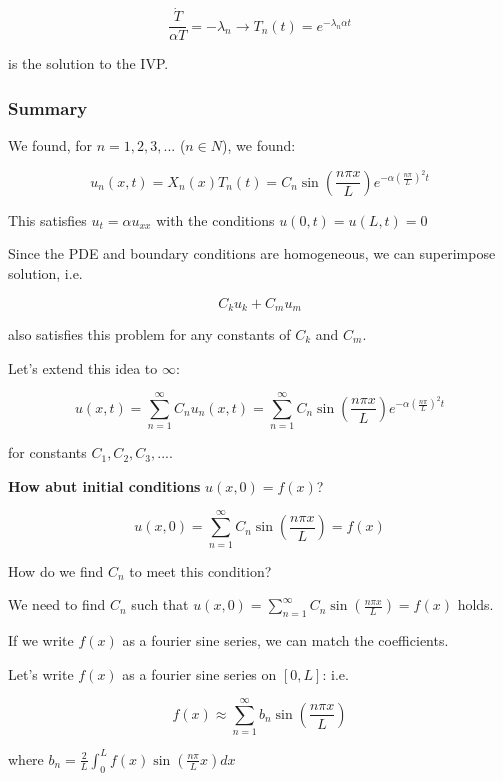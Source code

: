 $$\frac{\dot{T}}{\alpha T} = -\lambda_n \longrightarrow T_n(t) = e^{- \lambda_n \alpha t}$$

is the solution to the IVP. 

\subsubsection{Summary}

We found, for $n = 1,2,3,...$ ($n \in N$), we found:

$$u_n (x,t) = X_n (x) T_n (t) = C_n \sin \left(\frac{n \pi x}{L} \right) e^{- \alpha \left( \frac{n \pi}{L} \right)^2 t}$$

This satisfies $u_t = \alpha u_{xx}$ with the conditions $u(0,t) = u(L,t) = 0$

Since the PDE and boundary conditions are homogeneous, we can superimpose solution, i.e. 

$$C_k u_k + C_m u_m$$


also satisfies this problem for any constants of $C_k$ and $C_m$. 

Let's extend this idea to $\infty$:

$$u(x,t) = \sum_{n = 1}^\infty C_n u_n(x,t) = \sum_{n = 1}^\infty C_n \sin \left( \frac{n \pi x}{L} \right) e^{- \alpha \left( \frac{n \pi}{L} \right)^2 t}$$

for constants $C_1, C_2, C_3,...$. 

\textbf{How abut initial conditions} $u(x,0) = f(x)$?

\begin{equation}
    u(x,0) = \sum_{n = 1}^\infty C_n \sin \left( \frac{n \pi x}{L} \right) = f(x)
\end{equation}

How do we find $C_n$ to meet this condition?

We need to find $C_n$ such that $u(x,0) = \sum_{n = 1}^\infty C_n \sin \left( \frac{n \pi x}{L} \right) = f(x)$ holds. 

If we write $f(x)$ as a fourier sine series, we can match the coefficients. 

Let's write $f(x)$ as a fourier sine series on $[0,L]$: i.e. 


\begin{equation}
    f(x) \approx \sum_{n = 1}^\infty b_n \sin(\frac{n \pi x}{L})
\end{equation}

where $b_n = \frac{2}{L} \int_0^L f(x) \sin \left( \frac{n \pi}{L} x \right) dx$

